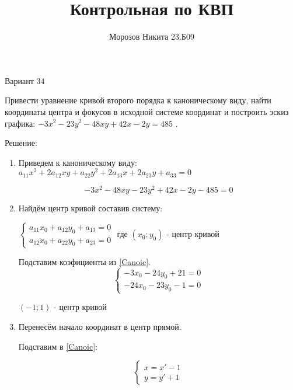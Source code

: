 \documentclass[a4paper, fontsize=14pt]{article} %
\title{Контрольная по КВП}
\author{Морозов Никита 23.Б09}
\date{}
\begin{document}
    
    \maketitle

    \centerline{Вариант 34} \bigskip

    \noindent Привести уравнение кривой второго порядка к каноническому виду, найти координаты центра и фокусов в 
    исходной системе координат и построить эскиз графика: $-3x^2 - 23y^2 - 48xy + 42x - 2y = 485$ . \bigskip

    Решение: \bigskip

    \begin{enumerate}
        \item Приведем к каноническому виду: $a_{11}x^2 + 2a_{12}xy + a_{22}y^2 + 2a_{13}x + 2a_{23}y + a_{33} = 0$
        
        \begin{equation} \label{Canoic}-3x^2 - 48xy - 23y^2 + 42x - 2y - 485 = 0 \end{equation}

        \item  Найдём центр кривой составив систему:
        
        $ 
        \begin{cases}
            a_{11}x_0 + a_{12}y_0 + a_{13} = 0\\
            a_{12}x_0 + a_{22}y_0 + a_{23} = 0
        \end{cases}
        $
        где $(x_0; y_0)$ - центр кривой

        Подставим коэфициенты из \eqref{Canoic}.
        \begin{equation} \label{Coordinates_system}
            \begin{cases}
                -3x_0 - 24y_0 + 21 = 0 \\
                -24x_0 - 23y_0 - 1 = 0
            \end{cases}
        \end{equation}

            $(-1;1)$ - центр кривой

        \item Перенесём начало координат в центр прямой.
        
        Подставим в \eqref{Canoic}:

        $$
        \begin{cases}
            x = x' -1\\
            y = y' + 1
        \end{cases}
        $$


\end{enumerate}
\end{document}
